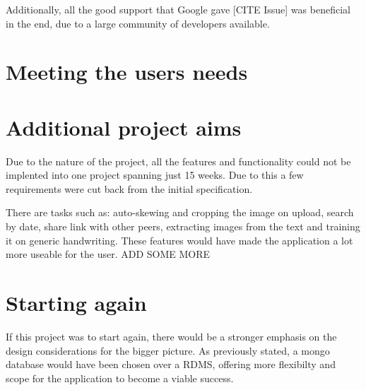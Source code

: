 Additionally, all the good support that Google gave [CITE Issue] was beneficial in the end, due to a large community of developers available.
\section{Meeting the users needs}
\section{Additional project aims}
Due to the nature of the project, all the features and functionality could not be implented into one project spanning just 15 weeks. Due to this a few requirements were cut back from the initial specification.

There are tasks such as: auto-skewing and cropping the image on upload, search by date, share link with other peers, extracting images from the text and training it on generic handwriting.  These features would have made the application a lot more useable for the user.
ADD SOME MORE
\section{Starting again}
If this project was to start again, there would be a stronger emphasis on the design considerations for the bigger picture. As previously stated, a mongo database would have been chosen over a RDMS, offering more flexibilty and scope for the application to become a viable success.
